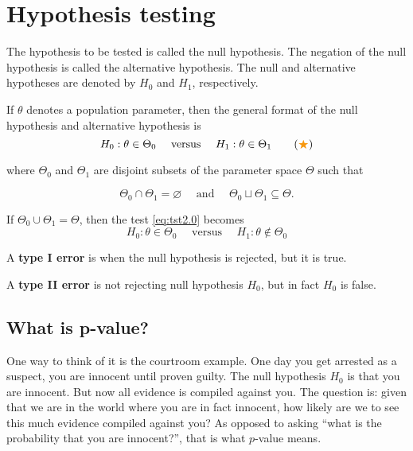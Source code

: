 \chapter{Hypothesis testing}

\begin{definition}
    The hypothesis to be tested is called the null hypothesis.
 The negation of the null hypothesis is called the alternative hypothesis. The
 null and alternative hypotheses are denoted by $H_0$ and $H_1$, respectively.

 If $\theta$ denotes a population parameter, then the general format of the null
 hypothesis and alternative hypothesis is
\[
    H_0 : \theta \in \Theta_0 \quad \text{ versus } \quad H_1 : \theta \in \Theta_1 \label{eq:tst2.0} \tag{{\color{YellowOrange} $\bigstar$}}
\]

where $\Theta_0$ and $\Theta_1$ are disjoint subsets of the parameter space $\Theta$ such that

\begin{equation}
    \Theta_0 \cap \Theta_1 = \varnothing \quad \text{ and } \quad \Theta_0 \sqcup \Theta_1 \subseteq \Theta.
\end{equation}
\end{definition}

\begin{remark}
    If $\Theta_0 \cup \Theta_1 = \Theta$, then the test \eqref{eq:tst2.0} becomes
    \begin{equation}
        H_0 : \theta \in \Theta_0 \quad \text{ versus } \quad H_1 : \theta \notin \Theta_0
    \end{equation}
\end{remark}

\begin{definition}
    A \textbf{type I error} is when the null hypothesis is rejected, but it is true. 
    
    A \textbf{type II error} is not rejecting null hypothesis $H_0$, but in fact $H_0$ is false.
\end{definition}

\section{What is p-value?}

One way to think of it is the courtroom example. One day you get arrested as a suspect, 
you are innocent until proven guilty.
The null hypothesis $H_0$ is that you are innocent. But now all evidence is compiled against you.
The question is: given that we are in the world where you are in fact innocent, how likely
are we to see this much evidence compiled against you? As opposed to asking ``what is the probability that you are innocent?'', that is what $p$-value means.

